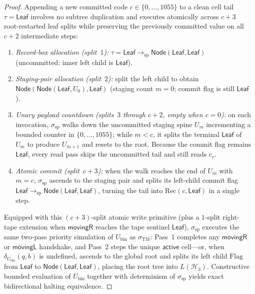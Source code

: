 \documentclass[11pt,reqno]{amsart}
\numberwithin{equation}{section}
\theoremstyle{plain}
\theoremstyle{definition}
\theoremstyle{remark}
\begin{document}
\begin{proof}
Appending a new committed code $c \in \{0,\dots,1055\}$ to a clean cell tail $\tau = \mathsf{Leaf}$ involves no subtree duplication and executes atomically across $c + 3$ root-restarted leaf splits while preserving the previously committed value on all $c + 2$ intermediate steps:
\begin{enumerate}[label=(\roman*),leftmargin=2.2em]
  \item \emph{Record-box allocation (split~$1$):} $\tau = \mathsf{Leaf} \to_{\mathrm{sp}} \mathsf{Node}(\mathsf{Leaf}, \mathsf{Leaf})$ (uncommitted: inner left child is $\mathsf{Leaf}$).
  \item \emph{Staging-pair allocation (split~$2$):} split the left child to obtain $\mathsf{Node}(\mathsf{Node}(\mathsf{Leaf}, U_0), \mathsf{Leaf})$ (staging count $m = 0$; commit flag is still $\mathsf{Leaf}$).
  \item \emph{Unary payload countdown (splits~$3$ through $c+2$, empty when $c = 0$):} on each invocation, $\sigma_{\mathrm{sp}}$ walks down the uncommitted staging spine $U_m$ incrementing a bounded counter in $\{0,\dots,1055\}$; while $m < c$, it splits the terminal $\mathsf{Leaf}$ of $U_m$ to produce $U_{m+1}$ and resets to the root. Because the commit flag remains $\mathsf{Leaf}$, every read pass skips the uncommitted tail and still reads $c_r$.
  \item \emph{Atomic commit (split~$c+3$):} when the walk reaches the end of $U_m$ with $m = c$, $\sigma_{\mathrm{sp}}$ ascends to the staging pair and splits its left-child commit flag $\mathsf{Leaf} \to_{\mathrm{sp}} \mathsf{Node}(\mathsf{Leaf},\mathsf{Leaf})$, turning the tail into $\mathrm{Rec}(c, \mathsf{Leaf})$ in a single step.
\end{enumerate}
Equipped with this $(c+3)$-split atomic write primitive (plus a $1$-split right-tape extension when $\mathsf{movingR}$ reaches the tape sentinel $\mathsf{Leaf}$), $\sigma_{\mathrm{sp}}$ executes the same two-pass priority simulation of $U_{\mathrm{bin}}$ as $\sigma_{\mathrm{TM}}$: Pass~1 completes any $\mathsf{movingR}$ or $\mathsf{movingL}$ handshake, and Pass~2 steps the unique $\mathsf{active}$ cell---or, when $\delta_{U_{\mathrm{bin}}}(q, b)$ is undefined, ascends to the global root and splits its left child $\mathrm{Flag}$ from $\mathsf{Leaf}$ to $\mathsf{Node}(\mathsf{Leaf},\mathsf{Leaf})$, placing the root tree into $L(\mathcal{H}_3)$. Constructive bounded evaluation of $U_{\mathrm{bin}}$ together with determinism of $\sigma_{\mathrm{sp}}$ yields exact bidirectional halting equivalence.
\end{proof}
\end{document}
